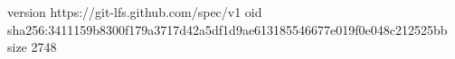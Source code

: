 version https://git-lfs.github.com/spec/v1
oid sha256:3411159b8300f179a3717d42a5df1d9ae613185546677e019f0e048c212525bb
size 2748
